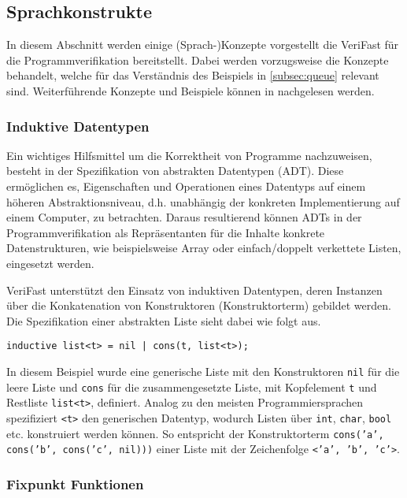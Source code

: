 \subsection{Sprachkonstrukte}

In diesem Abschnitt werden einige (Sprach-)Konzepte vorgestellt die VeriFast für die Programmverifikation bereitstellt. Dabei werden vorzugsweise die Konzepte behandelt, welche für das Verständnis des Beispiels in \cref{subsec:queue} relevant sind. Weiterführende Konzepte und Beispiele können in \cite{Jacobs2017} nachgelesen werden.

\subsubsection{Induktive Datentypen}
\label{subsubsec:adt}

Ein wichtiges Hilfsmittel um die Korrektheit von Programme nachzuweisen, besteht in der Spezifikation von abstrakten Datentypen (ADT). Diese ermöglichen es, Eigenschaften und Operationen eines Datentyps auf einem höheren Abstraktionsniveau, d.h. unabhängig der konkreten Implementierung auf einem Computer, zu betrachten. Daraus resultierend können ADTs in der Programmverifikation als Repräsentanten für die Inhalte konkrete Datenstrukturen, wie beispielsweise Array oder einfach/doppelt verkettete Listen, eingesetzt werden. \cite[S. 265]{Saake2014}

VeriFast unterstützt den Einsatz von induktiven Datentypen, deren Instanzen über die Konkatenation von Konstruktoren (Konstruktorterm) gebildet werden. Die Spezifikation einer abstrakten Liste sieht dabei wie folgt aus.

\begin{lstlisting}
inductive list<t> = nil | cons(t, list<t>);
\end{lstlisting}

\noindent
In diesem Beispiel wurde eine generische Liste mit den Konstruktoren \texttt{nil} für die leere Liste und \texttt{cons} für die zusammengesetzte Liste, mit Kopfelement \texttt{t} und Restliste \texttt{list<t>}, definiert. Analog zu den meisten Programmiersprachen spezifiziert \texttt{<t>} den generischen Datentyp, wodurch Listen über \texttt{int}, \texttt{char}, \texttt{bool} etc. konstruiert werden können. So entspricht der Konstruktorterm \texttt{cons('a', cons('b', cons('c', nil)))} einer Liste mit der Zeichenfolge \texttt{<'a', 'b', 'c'>}.

\subsubsection{Fixpunkt Funktionen}

